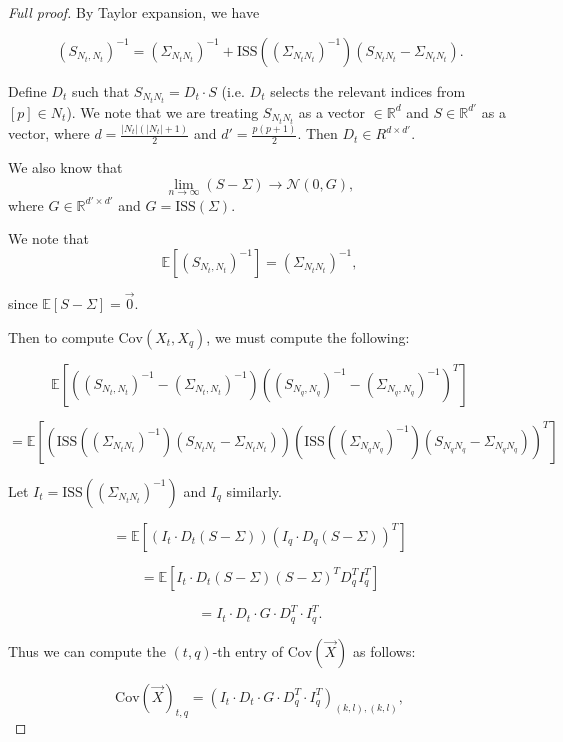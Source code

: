 \documentclass{article}
\theoremstyle{definition}
\newcommand{\ISS}{\text{ISS}}
\newcommand{\Cov}{\mathrm{Cov}}
\begin{document}
\begin{proof}[Full proof]

By Taylor expansion, we have

$$ \left( S_{N_t, N_t} \right)^{-1}  = \left( \Sigma_{N_t N_t}\right)^{-1} + \ISS \left( \left( \Sigma_{N_t N_t}\right)^{-1} \right) \left(S_{N_tN_t} - \Sigma_{N_t N_t} \right).$$

Define $D_t$ such that $S_{N_t N_t} = D_t \cdot S$ (i.e. $D_t$ selects the relevant indices from $[p] \in N_t$). We note that we are treating $S_{N_t N_t}$ as a vector $\in \mathbb{R}^{d}$ and $S \in \mathbb{R}^{d'}$ as a vector, where $d = \frac{|N_t|(|N_t| + 1)}{2}$ and $d' = \frac{p(p+1)}{2}$. Then $D_t \in R^{d \times d'}$. 

We also know that $$\lim_{n \rightarrow \infty} (S - \Sigma) \rightarrow \mathcal{N}(0, G),$$ where $G \in \mathbb{R}^{d' \times d'}$ and $G = \ISS(\Sigma)$.

We note that 
$$ \mathbb{E} \left[ \left( S_{N_t, N_t} \right)^{-1} \right] =   \left( \Sigma_{N_t N_t}\right)^{-1},$$

since $\mathbb{E}[S - \Sigma] = \vec{0}$. 

Then to compute $\Cov(X_t, X_q)$, we must compute the following: 

$$\mathbb{E} \left[  \left( \left( S_{N_t, N_t} \right)^{-1} - \left( \Sigma_{N_t, N_t}\right)^{-1} \right) \left( \left( S_{N_q, N_q} \right)^{-1} - \left( \Sigma_{N_q, N_q}\right)^{-1} \right)^T \right]$$

$$ = \mathbb{E} \left[ \left( \ISS \left( \left( \Sigma_{N_t N_t}\right)^{-1} \right) \left(S_{N_tN_t} - \Sigma_{N_t N_t} \right) \right) \left( \ISS \left( \left( \Sigma_{N_q N_q}\right)^{-1} \right) \left(S_{N_qN_q} - \Sigma_{N_q N_q} \right) \right)^T \right]$$

Let $I_t = \ISS \left( \left( \Sigma_{N_t N_t}\right)^{-1} \right)$ and $I_q$ similarly.

$$ = \mathbb{E} \left[ (I_t \cdot D_t (S - \Sigma)) (I_q \cdot D_q (S-\Sigma))^T \right]$$

$$ = \mathbb{E} \left[ I_t \cdot D_t (S - \Sigma)(S - \Sigma)^T D_q^T I_q^T \right]$$

$$ = I_t \cdot D_t \cdot G \cdot D_q^T \cdot I_q^T.$$


Thus we can compute the $(t,q)$-th entry of $\Cov(\vec{X})$ as follows: 

$$\Cov(\vec{X})_{t, q} = \left( I_t \cdot D_t \cdot G \cdot D_q^T \cdot I_q^T \right)_{(k,l), (k,l)},$$


\end{proof}
\end{document}
